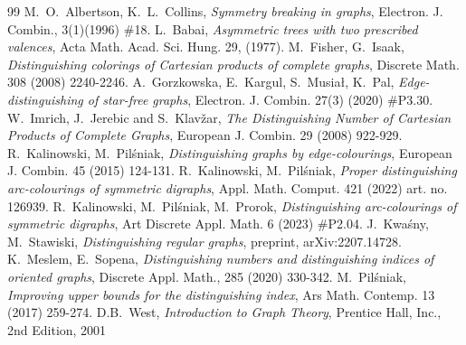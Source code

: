\documentclass[a4paper,12pt]{elsarticle}
\begin{document}
\begin{thebibliography}{99}
M.~O.~Albertson, K.~L.~Collins, \emph{Symmetry breaking in graphs}, Electron. J. Combin., 3(1)(1996) \#18.
L.~Babai, \emph{Asymmetric trees with two prescribed valences}, Acta Math. Acad. Sci. Hung. 29, (1977).
M.~Fisher, G.~Isaak, \emph{Distinguishing colorings of Cartesian products of complete graphs}, Discrete Math. 308 (2008) 2240-2246.
A.~Gorzkowska, E.~Kargul, S.~Musia{\l}, K.~Pal, \emph{Edge-distinguishing of star-free graphs},  Electron. J. Combin. 27(3) (2020) \#P3.30.
  W.~Imrich, J.~Jerebic and S.~Klav{\v{z}}ar,
  \emph{The Distinguishing Number of Cartesian Products of Complete Graphs},
  European J. Combin. 29 (2008) 922-929.
R.~Kalinowski, M.~Pil\'sniak, \emph{Distinguishing graphs by edge-colourings}, European J. Combin. 45 (2015) 124-131.
R.~Kalinowski, M.~Pil\'sniak, \emph{Proper distinguishing arc-colourings of symmetric digraphs}, Appl. Math. Comput. 421 (2022)  art. no. 126939.
R.~Kalinowski, M.~Pil\'sniak, M.~Prorok, \emph{Distinguishing arc-colourings of symmetric digraphs}, Art Discrete Appl. Math. 6 (2023) \#P2.04.
J.~Kwa\'sny, M.~Stawiski, \emph{Distinguishing regular graphs}, preprint, arXiv:2207.14728.
K.~Meslem, E.~Sopena, \emph{Distinguishing numbers and distinguishing indices of oriented graphs}, Discrete Appl. Math., 285 (2020) 330-342.
M.~Pil\'sniak, \emph{Improving upper bounds for the distinguishing index}, Ars Math. Contemp. 13 (2017) 259-274.
D.B.~West, \emph{Introduction to Graph Theory}, 
Prentice Hall, Inc., 2nd Edition, 2001


\end{thebibliography}
\end{document}
